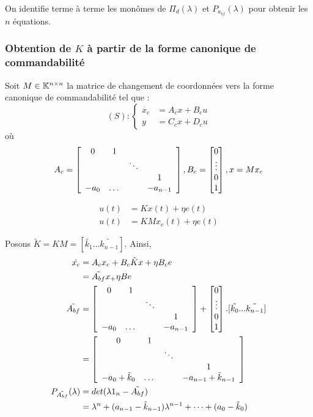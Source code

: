 \documentclass[main.tex]{subfiles}
\begin{document}
On identifie terme à terme les monômes de $\Pi_d(\lambda)$ et $P_{a_{bf}}(\lambda)$ pour obtenir les $n$ équations.

\subsubsection{Obtention de $K$ à partir de la forme canonique de commandabilité}

Soit $M \in \mathbb{K}^{n\times n} $ la matrice de changement de coordonnées vers la forme canonique de commandabilité tel que :
\[ (S) :
\left\{
\begin{array}{ll}
\dot{x_c} &= A_cx + B_cu\\
y & = C_cx+D_cu
\end{array}
\right.
\]
où \[ A_c = \left[ \begin{array}{cccc}
0 & 1 \\
& & \ddots \\
& & & 1 \\
-a_0 & \dots & & -a_{n-1}
\end{array}\right], B_c = \begin{bmatrix} 0 \\ \vdots \\ 0 \\ 1 \end{bmatrix}, x = Mx_c \]

\begin{align*}
u(t) & = Kx(t) + \eta e(t) \\
u(t) & = KMx_c(t) + \eta e(t)
\end{align*}

Posons $\tilde{K} = KM = [\tilde{k_1}\dots\tilde{k_{n-1}}]$. Ainsi,
\begin{align*}
\dot{x_c} & = A_c x_c + B_c \tilde{K}x + \eta B_c e \\
& = \tilde{A_{bf}}x_ + \eta B e \\
\tilde{A_{bf}} & =
\left[ \begin{array}{cccc}
0 & 1 \\
& & \ddots \\
& & & 1 \\
-a_0 & \dots & & -a_{n-1}
\end{array}\right] +
\begin{bmatrix} 0 \\  \vdots \\ 0 \\ 1 \end{bmatrix}.[\tilde{k_0}...\tilde{k_{n-1}}] \\
& = \left[ \begin{array}{cccc}
0 & 1 \\
& & \ddots \\
& & & 1 \\
-a_0 + \tilde{k}_0 & \dots & & -a_{n-1} +\tilde{k}_{n-1}
\end{array}\right]\\
P_{\tilde{A_{bf}}}(\lambda) & = det(\lambda1_n - \tilde{A_{bf}}) \\
& = \lambda^n + (a_{n-1}-\tilde{k}_{n-1})\lambda^{n-1} + \dots + (a_0-\tilde{k}_0)
\end{align*}
\end{document}
